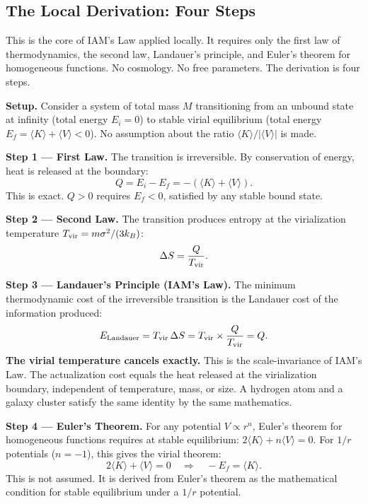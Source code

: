 \documentclass[12pt,a4paper]{article}
\begin{document}
\subsection{The Local Derivation: Four Steps}
\label{sec:local}

This is the core of IAM's Law applied locally. It requires only the first law of
thermodynamics, the second law, Landauer's principle, and Euler's theorem for
homogeneous functions. No cosmology. No free parameters. The derivation is
four steps.

\textbf{Setup.} Consider a system of total mass $M$ transitioning from an
unbound state at infinity (total energy $E_i = 0$) to stable virial equilibrium
(total energy $E_f = \langle K \rangle + \langle V \rangle < 0$). No
assumption about the ratio $\langle K \rangle / |\langle V \rangle|$ is made.

\textbf{Step 1 --- First Law.} The transition is irreversible. By conservation
of energy, heat is released at the boundary:
\begin{equation}
Q = E_i - E_f = -(\langle K \rangle + \langle V \rangle).
\end{equation}
This is exact. $Q > 0$ requires $E_f < 0$, satisfied by any stable bound state.

\textbf{Step 2 --- Second Law.} The transition produces entropy at the
virialization temperature $T_{\rm vir} = m\sigma^2/(3k_B)$:
\begin{equation}
\Delta S = \frac{Q}{T_{\rm vir}}.
\end{equation}

\textbf{Step 3 --- Landauer's Principle (IAM's Law).} The minimum thermodynamic
cost of the irreversible transition is the Landauer cost of the information produced:
\begin{equation}
E_{\rm Landauer} = T_{\rm vir}\,\Delta S
= T_{\rm vir} \times \frac{Q}{T_{\rm vir}} = Q.
\end{equation}
\textbf{The virial temperature cancels exactly.} This is the scale-invariance of
IAM's Law. The actualization cost equals the heat released at the virialization
boundary, independent of temperature, mass, or size. A hydrogen atom and a galaxy
cluster satisfy the same identity by the same mathematics.

\textbf{Step 4 --- Euler's Theorem.} For any potential $V \propto r^n$, Euler's
theorem for homogeneous functions requires at stable equilibrium:
$2\langle K \rangle + n\langle V \rangle = 0$.
For $1/r$ potentials ($n = -1$), this gives the virial theorem:
\begin{equation}
2\langle K \rangle + \langle V \rangle = 0
\quad\Longrightarrow\quad
-E_f = \langle K \rangle.
\end{equation}
This is not assumed. It is derived from Euler's theorem as the mathematical
condition for stable equilibrium under a $1/r$ potential.
\end{document}
